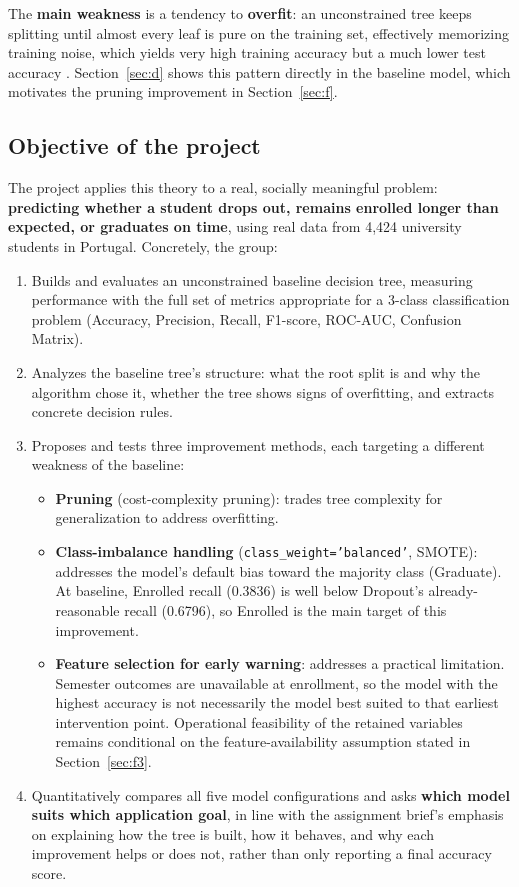 The \textbf{main weakness} is a tendency to \textbf{overfit}: an
unconstrained tree keeps splitting until almost every leaf is pure on the
training set, effectively memorizing training noise, which yields very
high training accuracy but a much lower test accuracy
\citep{mitchell1997machine, breiman1984classification}. Section~\ref{sec:d}
shows this pattern directly in the baseline model, which motivates the
pruning improvement in Section~\ref{sec:f}.

\subsection{Objective of the project}

The project applies this theory to a real, socially meaningful problem:
\textbf{predicting whether a student drops out, remains enrolled longer
than expected, or graduates on time}, using real data from 4{,}424
university students in Portugal. Concretely, the group:

\begin{enumerate}
  \item Builds and evaluates an unconstrained baseline decision tree,
    measuring performance with the full set of metrics appropriate for a
    3-class classification problem (Accuracy, Precision, Recall,
    F1-score, ROC-AUC, Confusion Matrix).
  \item Analyzes the baseline tree's structure: what the root split is
    and why the algorithm chose it, whether the tree shows signs of
    overfitting, and extracts concrete decision rules.
  \item Proposes and tests three improvement methods, each targeting a
    different weakness of the baseline:
  \begin{itemize}
    \item \textbf{Pruning} (cost-complexity pruning): trades tree
      complexity for generalization to address overfitting.
    \item \textbf{Class-imbalance handling}
      (\texttt{class\_weight='balanced'}, SMOTE): addresses the model's
      default bias toward the majority class (Graduate). At baseline,
      Enrolled recall (0.3836) is well below Dropout's already-reasonable
      recall (0.6796), so Enrolled is the main target of this improvement.
    \item \textbf{Feature selection for early warning}: addresses a
      practical limitation. Semester outcomes are unavailable at enrollment,
      so the model with the highest accuracy is not necessarily the model best
      suited to that earliest intervention point. Operational feasibility of
      the retained variables remains conditional on the feature-availability
      assumption stated in Section~\ref{sec:f3}.
  \end{itemize}
  \item Quantitatively compares all five model configurations and asks
    \textbf{which model suits which application goal}, in line with the
    assignment brief's emphasis on explaining how the tree is built, how
    it behaves, and why each improvement helps or does not, rather than
    only reporting a final accuracy score.
\end{enumerate}
